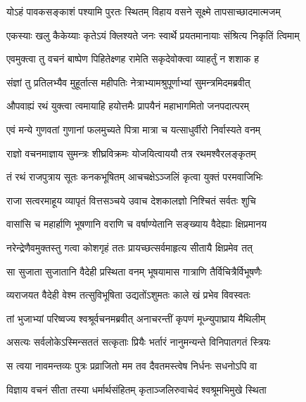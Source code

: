 \twolineshloka
{योऽहं पावकसङ्काशं पश्यामि पुरतः स्थितम्}
{विहाय वसने सूक्ष्मे तापसाच्छादमात्मजम्} %

\twolineshloka
{एकस्याः खलु कैकेय्याः कृतेऽयं क्लिश्यते जनः}
{स्वार्थे प्रयतमानायाः संश्रित्य निकृतिं त्विमाम्} %

\twolineshloka
{एवमुक्त्वा तु वचनं बाष्पेण पिहितेक्ष्णह}
{रामेति सकृदेवोक्त्वा व्याहर्तुं न शशाक ह} %

\twolineshloka
{संज्ञां तु प्रतिलभ्यैव मुहूर्तात्स महीपतिः}
{नेत्राभ्यामश्रुपूर्णाभ्यां सुमन्त्रमिदमब्रवीत्} %

\twolineshloka
{औपवाह्यं रथं युक्त्वा त्वमायाहि हयोत्तमैः}
{प्रापयैनं महाभागमितो जनपदात्परम्} %

\twolineshloka
{एवं मन्ये गुणवतां गुणानां फलमुच्यते}
{पित्रा मात्रा च यत्साधुर्वीरो निर्वास्यते वनम्} %

\twolineshloka
{राज्ञो वचनमाज्ञाय सुमन्त्रः शीघ्रविक्रमः}
{योजयित्वाययौ तत्र रथमश्वैरलङ्कृतम्} %

\twolineshloka
{तं रथं राजपुत्राय सूतः कनकभूषितम्}
{आचचक्षेऽञ्जलिं कृत्वा युक्तं परमवाजिभिः} %

\twolineshloka
{राजा सत्वरमाहूय व्यापृतं वित्तसञ्चये}
{उवाच देशकालज्ञो निश्चितं सर्वतः शुचि} %

\twolineshloka
{वासांसि च महार्हाणि भूषणानि वराणि च}
{वर्षाण्येतानि सङ्ख्याय वैदेह्याः क्षिप्रमानय} %

\twolineshloka
{नरेन्द्रेणैवमुक्तस्तु गत्वा कोशगृहं ततः}
{प्रायच्छत्सर्वमाहृत्य सीतायै क्षिप्रमेव तत्} %

\twolineshloka
{सा सुजाता सुजातानि वैदेही प्रस्थिता वनम्}
{भूषयामास गात्राणि तैर्विचित्रैर्विभूषणैः} %

\twolineshloka
{व्यराजयत वैदेही वेश्म तत्सुविभूषिता}
{उद्यतोंऽशुमतः काले खं प्रभेव विवस्वतः} %

\twolineshloka
{तां भुजाभ्यां परिष्वज्य श्वश्रूर्वचनमब्रवीत्}
{अनाचरन्तीं कृपणं मूध्न्युपाघ्राय मैथिलीम्} %

\twolineshloka
{असत्यः सर्वलोकेऽस्मिन्सततं सत्कृताः प्रियैः}
{भर्तारं नानुमन्यन्ते विनिपातगतं स्त्रियः} %

\twolineshloka
{स त्वया नावमन्तव्यः पुत्रः प्रव्राजितो मम}
{तव दैवतमस्त्वेष निर्धनः सधनोऽपि वा} %

\twolineshloka
{विज्ञाय वचनं सीता तस्या धर्मार्थसंहितम्}
{कृताञ्जलिरुवाचेदं श्वश्रूमभिमुखे स्थिता} %

